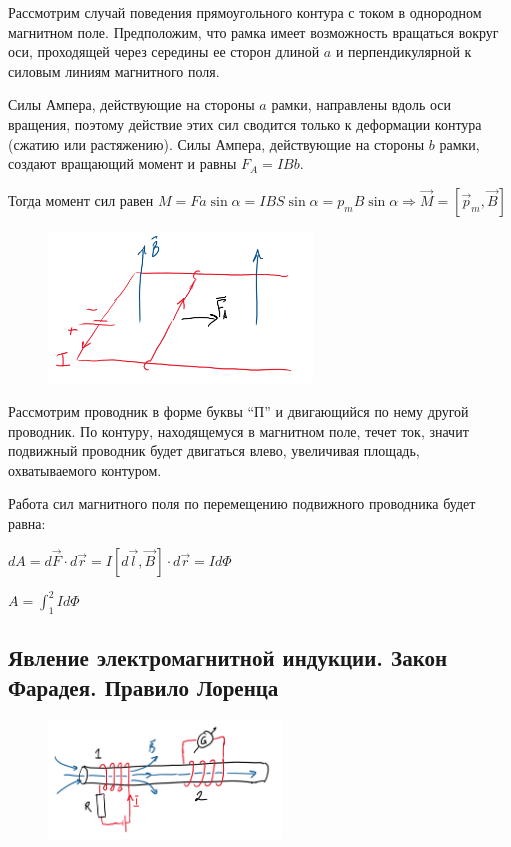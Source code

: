 \Ex Рассмотрим случай поведения прямоугольного контура с током в однородном магнитном поле. 
Предположим, что рамка имеет возможность вращаться вокруг оси, проходящей через середины ее
сторон длиной $a$ и перпендикулярной к силовым линиям магнитного поля.

Силы Ампера, действующие на стороны $a$ рамки, направлены вдоль оси вращения, 
поэтому действие этих сил сводится только к деформации контура (сжатию или растяжению).
Силы Ампера, действующие на стороны $b$ рамки, создают вращающий момент и равны $F_A = IBb$.

Тогда момент сил равен $M = F a \sin \alpha = I B S \sin \alpha = p_m B \sin \alpha \Longrightarrow \vec{M} = [\vec{p}_m, \vec{B}]$

\begin{figure}
    \includegraphics[width=7cm]{physics2/images/physics2_2025_02_24_3}
\end{figure}

\Ex Рассмотрим проводник в форме буквы \enquote{П} и двигающийся по нему другой проводник. 
По контуру, находящемуся в магнитном поле, течет ток, значит подвижный проводник будет двигаться влево, 
увеличивая площадь, охватываемого контуром. 

Работа сил магнитного поля по перемещению подвижного проводника будет равна:

$dA = d\vec{F} \cdot d\vec{r} = I [d\vec{l}, \vec{B}] \cdot d\vec{r} = Id\Phi$

$A = \int_1^2 Id\Phi$


\subsection{Явление электромагнитной индукции. Закон Фарадея. Правило Лоренца}

\begin{figure}
    \includegraphics[width=6.2cm]{physics2/images/physics2_2025_02_24_4}
\end{figure}

